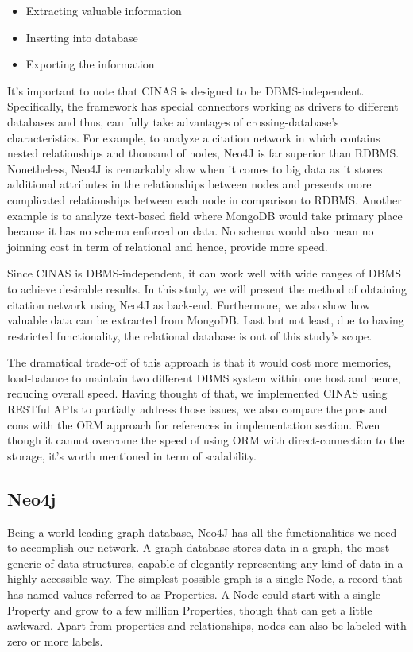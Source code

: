 \documentclass{sig-alternate}
\begin{document}
{\begin{itemize}
\item Extracting valuable information
\item Inserting into database
\item Exporting the information
\end{itemize}

It's important to note that CINAS is designed to be DBMS-independent. Specifically, the framework has special connectors working as drivers to different databases and thus, can fully take advantages of crossing-database's characteristics. For example, to analyze a citation network in which contains nested relationships and thousand of nodes,  Neo4J is far superior than RDBMS. Nonetheless, Neo4J is remarkably slow when it comes to big data as it stores additional attributes in the relationships between nodes and presents more complicated relationships between each node in comparison to RDBMS. Another example is to analyze text-based field where MongoDB would take primary place because it has no schema enforced on data. No schema would also mean no joinning cost in term of relational and hence, provide more speed. 

Since CINAS is DBMS-independent, it can work well with wide ranges of DBMS to achieve desirable results. In this study, we will present the method of obtaining citation network using Neo4J as back-end. Furthermore, we also show how valuable data can be extracted from MongoDB. Last but not least, due to having restricted functionality, the relational database is out of this study's scope.

The dramatical trade-off of this approach is that it would cost more memories, load-balance to maintain two different DBMS system within one host and hence, reducing overall speed. Having thought of that, we implemented CINAS using RESTful APIs to partially address those issues, we also compare the pros and cons with the ORM approach for references in implementation section. Even though it cannot overcome the speed of using ORM with direct-connection to the storage, it's worth mentioned in term of scalability.
\subsection{Neo4j }
Being a world-leading graph database, Neo4J has all the functionalities we need to accomplish our network. A graph database stores data in a graph, the most generic of data structures, capable of elegantly representing any kind of data in a highly accessible way. The simplest possible graph is a single Node, a record that has named values referred to as Properties. A Node could start with a single Property and grow to a few million Properties, though that can get a little awkward. Apart from properties and relationships, nodes can also be labeled with zero or more labels.

}
\end{document}
